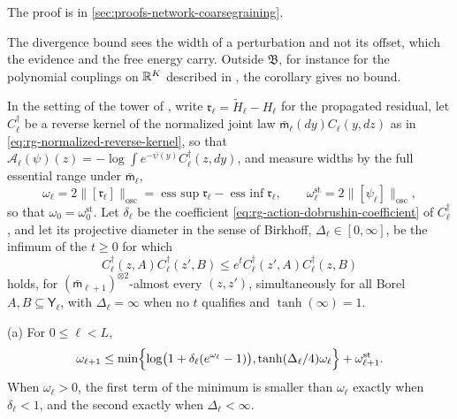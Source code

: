 The proof is in \cref{sec:proofs-network-coarsegraining}.

The divergence bound sees the width of a perturbation and not its offset, which the
evidence and the free energy carry. Outside $\mathfrak B$, for instance for the
polynomial couplings on $\mathbb R^K$ described in , the
corollary gives no bound.

In the setting of the tower of , write
$\mathfrak r_\ell=\widetilde H_\ell-H_\ell$ for the propagated residual, let
$C^\dagger_\ell$ be a reverse kernel of the normalized joint law
$\bar{\mathsf m}_\ell(dy)C_\ell(y,dz)$ as in \eqref{eq:rg-normalized-reverse-kernel},
so that $\mathcal A_\ell(\psi)(z)=-\log\int e^{-\psi(y)}C^\dagger_\ell(z,dy)$, and
measure widths by the full essential range under $\bar{\mathsf m}_\ell$,
\begin{equation}
\omega_\ell=2\lVert[\mathfrak r_\ell]\rVert_{\mathrm{osc}}
=\operatorname*{ess~sup}\mathfrak r_\ell-\operatorname*{ess~inf}\mathfrak r_\ell,
\qquad
\omega^{\mathrm{st}}_\ell=2\lVert[\psi_\ell]\rVert_{\mathrm{osc}},
\label{eq:rg-tower-widths}
\end{equation}
so that $\omega_0=\omega^{\mathrm{st}}_0$. Let $\delta_\ell$ be the coefficient
\eqref{eq:rg-action-dobrushin-coefficient} of $C^\dagger_\ell$, and let its
projective diameter in the sense of Birkhoff, $\Delta_\ell\in[0,\infty]$, be the
infimum of the $t\ge0$ for which
\begin{equation}
C^\dagger_\ell(z,A)C^\dagger_\ell(z',B)\le e^{t}C^\dagger_\ell(z',A)C^\dagger_\ell(z,B)
\label{eq:rg-birkhoff-diameter}
\end{equation}
holds, for $(\bar{\mathsf m}_{\ell+1})^{\otimes2}$-almost every $(z,z')$, simultaneously
for all Borel $A,B\subseteq\mathsf Y_\ell$, with
$\Delta_\ell=\infty$ when no $t$ qualifies and $\tanh(\infty)=1$.

(a) For $0\le\ell<L$,
\begin{equation}
\omega_{\ell+1}\le\min\Bigl\{\log\bigl(1+\delta_\ell(e^{\omega_\ell}-1)\bigr),
\tanh(\Delta_\ell/4)\omega_\ell\Bigr\}+\omega^{\mathrm{st}}_{\ell+1}.
\label{eq:rg-contracted-width-recursion}
\end{equation}
When $\omega_\ell>0$, the first term of the minimum is smaller than $\omega_\ell$
exactly when $\delta_\ell<1$, and the second exactly when $\Delta_\ell<\infty$.

